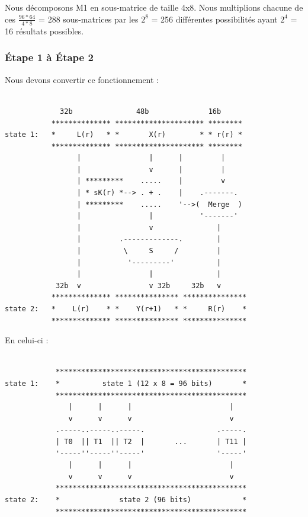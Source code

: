 \documentclass[a4paper,12pt]{article}
\begin{document}
Nous décomposons M1 en sous-matrice de taille 4x8. Nous multiplions chacune de ces $\frac{96*64}{4*8}$ = 288 sous-matrices par les $2^8$ = 256 différentes possibilités ayant $2^4$ = 16 résultats possibles.


\subsubsection{Étape 1 à Étape 2}

Nous devons convertir ce fonctionnement :

\begin{Verbatim}[samepage=true]
			
             32b               48b              16b
           ************** ********************* ********
state 1:   *     L(r)   * *       X(r)        * * r(r) *
           ************** ********************* ********
                 |                |      |         |
                 |                v      |         |
                 | *********    .....    |         v
                 | * sK(r) *--> . + .    |    .-------.
                 | *********    .....    '-->(  Merge  )
                 |                |           '-------'
                 |                v               |
                 |         .-------------.        |
                 |          \     S     /         |
                 |           '---------'          |
                 |                |               |
            32b  v                v 32b     32b   v
           ************** *************** ***************
state 2:   *    L(r)    * *    Y(r+1)   * *     R(r)    *
           ************** *************** ***************

\end{Verbatim}		

En celui-ci :

\begin{Verbatim}[samepage=true]

            *********************************************
state 1:    *          state 1 (12 x 8 = 96 bits)       *
            *********************************************
               |      |      |                       |
               v      v      v                       v
            .-----..-----..-----.                 .-----.
            | T0  || T1  || T2  |       ...       | T11 |
            '-----''-----''-----'                 '-----'
               |      |      |                       |
               v      v      v                       v
            *********************************************
state 2:    *              state 2 (96 bits)            *
            *********************************************			
			
\end{Verbatim}
		
\end{document}
